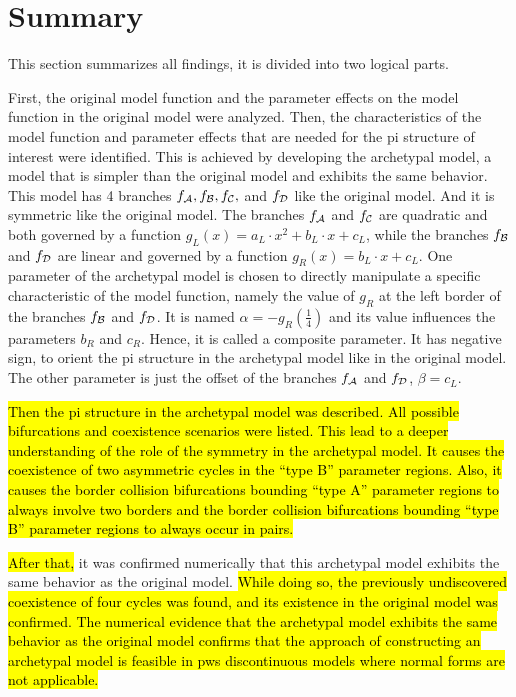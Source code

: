 \section{Summary}
\label{sec:concl.sum}

This section summarizes all findings, it is divided into two logical parts.

First, the original model function and the parameter effects on the model function in the original model were analyzed.
Then, the characteristics of the model function and parameter effects that are needed for the \gls{pi} structure of interest were identified.
This is achieved by developing the archetypal model, a model that is simpler than the original model and exhibits the same behavior.
This model has 4 branches $f_{\mathcal{A}}, f_{\mathcal{B}}, f_{\mathcal{C}},$ and $f_{\mathcal{D}}$ like the original model.
And it is symmetric like the original model.
The branches $f_{\mathcal{A}}$ and $f_{\mathcal{C}}$ are quadratic and both governed by a function $g_L(x) = a_L \cdot x^2 + b_L \cdot x + c_L$, while the branches $f_{\mathcal{B}}$ and $f_{\mathcal{D}}$ are linear and governed by a function $g_R(x) = b_L \cdot x + c_L$.
One parameter of the archetypal model is chosen to directly manipulate a specific characteristic of the model function, namely the value of $g_R$ at the left border of the branches $f_{\mathcal{B}}$ and $f_{\mathcal{D}}$.
It is named $\alpha = -g_R\left(\frac{1}{4}\right)$ and its value influences the parameters $b_R$ and $c_R$.
Hence, it is called a composite parameter.
It has negative sign, to orient the \gls{pi} structure in the archetypal model like in the original model.
The other parameter is just the offset of the branches $f_{\mathcal{A}}$ and $f_{\mathcal{D}}$, $\beta = c_L$.

\hl{
	Then the \gls{pi} structure in the archetypal model was described.
	All possible bifurcations and coexistence scenarios were listed.
	This lead to a deeper understanding of the role of the symmetry in the archetypal model.
	It causes the coexistence of two asymmetric cycles in the ``type B'' parameter regions.
	Also, it causes the border collision bifurcations bounding ``type A'' parameter regions to always involve two borders
	and the border collision bifurcations bounding ``type B'' parameter regions to always occur in pairs.
}

\hl{After that,} it was confirmed numerically that this archetypal model exhibits the same behavior as the original model.
\hl{
	While doing so, the previously undiscovered coexistence of four cycles was found, and its existence in the original model was confirmed.
	The numerical evidence that the archetypal model exhibits the same behavior as the original model confirms that the approach of constructing an archetypal model is feasible in \gls{pws} discontinuous models where normal forms are not applicable.
}

